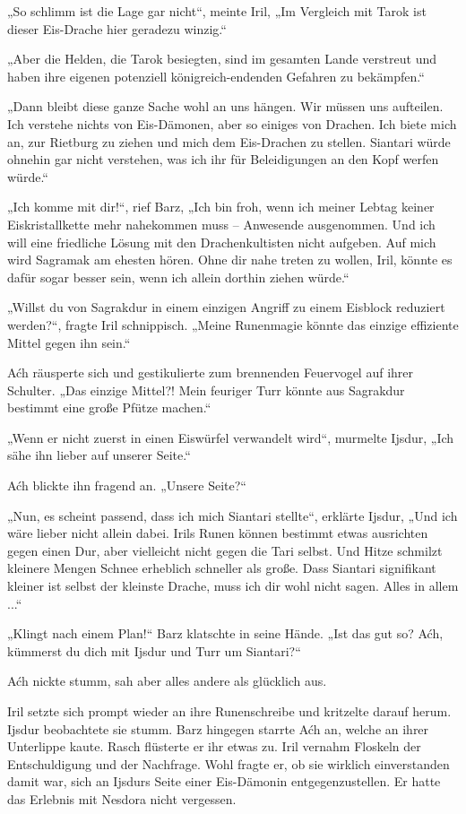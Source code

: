 „So schlimm ist die Lage gar nicht“, meinte Iril, „Im Vergleich mit Tarok ist dieser Eis-Drache hier geradezu winzig.“

„Aber die Helden, die Tarok besiegten, sind im gesamten Lande verstreut und haben ihre eigenen potenziell königreich-endenden Gefahren zu bekämpfen.“

„Dann bleibt diese ganze Sache wohl an uns hängen. Wir müssen uns aufteilen. Ich verstehe nichts von Eis-Dämonen, aber so einiges von Drachen. Ich biete mich an, zur Rietburg zu ziehen und mich dem Eis-Drachen zu stellen. Siantari würde ohnehin gar nicht verstehen, was ich ihr für Beleidigungen an den Kopf werfen würde.“

„Ich komme mit dir!“, rief Barz, „Ich bin froh, wenn ich meiner Lebtag keiner Eiskristallkette mehr nahekommen muss – Anwesende ausgenommen. Und ich will eine friedliche Lösung mit den Drachenkultisten nicht aufgeben. Auf mich wird Sagramak am ehesten hören. Ohne dir nahe treten zu wollen, Iril, könnte es dafür sogar besser sein, wenn ich allein dorthin ziehen würde.“

„Willst du von Sagrakdur in einem einzigen Angriff zu einem Eisblock reduziert werden?“, fragte Iril schnippisch. „Meine Runenmagie könnte das einzige effiziente Mittel gegen ihn sein.“

Aćh räusperte sich und gestikulierte zum brennenden Feuervogel auf ihrer Schulter. „Das einzige Mittel?! Mein feuriger Turr könnte aus Sagrakdur bestimmt eine große Pfütze machen.“

„Wenn er nicht zuerst in einen Eiswürfel verwandelt wird“, murmelte Ijsdur, „Ich sähe ihn lieber auf unserer Seite.“

Aćh blickte ihn fragend an. „Unsere Seite?“

„Nun, es scheint passend, dass ich mich Siantari stellte“, erklärte Ijsdur, „Und ich wäre lieber nicht allein dabei. Irils Runen können bestimmt etwas ausrichten gegen einen Dur, aber vielleicht nicht gegen die Tari selbst. Und Hitze schmilzt kleinere Mengen Schnee erheblich schneller als große. Dass Siantari signifikant kleiner ist selbst der kleinste Drache, muss ich dir wohl nicht sagen. Alles in allem ...“

„Klingt nach einem Plan!“ Barz klatschte in seine Hände. „Ist das gut so? Aćh, kümmerst du dich mit Ijsdur und Turr um Siantari?“

Aćh nickte stumm, sah aber alles andere als glücklich aus.

Iril setzte sich prompt wieder an ihre Runenschreibe und kritzelte darauf herum. Ijsdur beobachtete sie stumm. Barz hingegen starrte Aćh an, welche an ihrer Unterlippe kaute. Rasch flüsterte er ihr etwas zu. Iril vernahm Floskeln der Entschuldigung und der Nachfrage. Wohl fragte er, ob sie wirklich einverstanden damit war, sich an Ijsdurs Seite einer Eis-Dämonin entgegenzustellen. Er hatte das Erlebnis mit Nesdora nicht vergessen.

